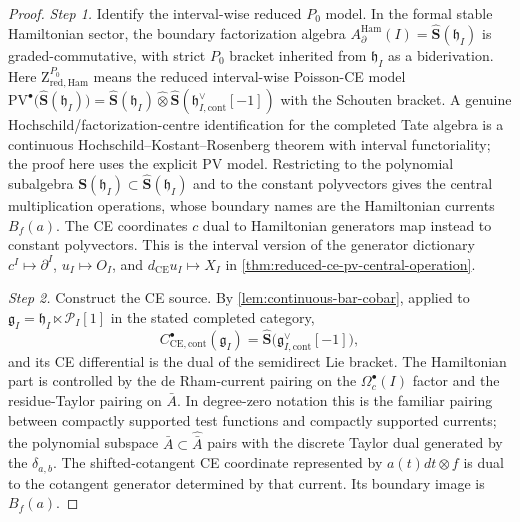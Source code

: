 \documentclass[11pt]{memoir}
\begin{document}
\begin{proof}
  \emph{Step 1.} Identify the interval-wise reduced \(P_0\) model. In
  the formal stable Hamiltonian sector, the boundary factorization algebra
  $A_\partial^{\mathrm{Ham}}(I)=\widehat{\mathbf S}(\mathfrak h_I)$
  is graded-commutative, with strict $P_0$ bracket inherited from
  $\mathfrak h_I$ as a biderivation.  Here
  \(\mathrm Z^{P_0}_{\mathrm{red,Ham}}\) means the reduced
  interval-wise Poisson-CE model
  $\mathrm{PV}^\bullet\bigl(\widehat{\mathbf S}(\mathfrak h_I)\bigr)
  =\widehat{\mathbf S}(\mathfrak h_I)\widehat\otimes
	    \widehat{\mathbf S}(\mathfrak h^{\vee}_{I,\mathrm{cont}}[-1])$
  with the Schouten bracket.  A genuine Hochschild/factorization-centre
  identification for the completed Tate algebra is a continuous
  Hochschild--Kostant--Rosenberg theorem with interval functoriality; the proof here
  uses the explicit PV model. Restricting to the
  polynomial subalgebra
  $\mathbf S(\mathfrak h_I)\subset\widehat{\mathbf S}(\mathfrak h_I)$
  and to the constant polyvectors gives the central multiplication
  operations, whose boundary names are the Hamiltonian currents
  \(B_f(a)\). The CE coordinates \(c\) dual to
  Hamiltonian generators map instead to constant polyvectors. This is
  the interval version of the generator dictionary
  $c^I\mapsto\partial^I$, $u_I\mapsto O_I$, and
  $d_{\mathrm{CE}}u_I\mapsto X_I$ in
  \ref{thm:reduced-ce-pv-central-operation}.

  \emph{Step 2.} Construct the CE source. By
  \ref{lem:continuous-bar-cobar}, applied to
  $\mathfrak g_I=\mathfrak h_I\ltimes\mathcal P_I[1]$ in the stated
  completed category,
  $$C^\bullet_{\mathrm{CE},\mathrm{cont}}(\mathfrak g_I)
   =\widehat{\mathbf S}\bigl(\mathfrak g^{\vee}_{I,\mathrm{cont}}[-1]\bigr),$$
  and its CE differential is the dual of the semidirect Lie bracket.
  The Hamiltonian part is controlled by the de Rham-current pairing on
  the $\Omega_c^\bullet(I)$ factor and the residue-Taylor pairing on
  $\bar A$. In degree-zero notation this is the familiar pairing between
  compactly supported test functions and compactly supported currents;
  the polynomial subspace $\bar A\subset\widehat{\bar A}$ pairs with the
  discrete Taylor dual generated by the $\delta_{a,b}$. The
  shifted-cotangent CE coordinate represented by \(a(t)dt\otimes f\)
  is dual to the cotangent generator determined by that current. Its
  boundary image is \(B_f(a)\).


\end{proof}
\end{document}
